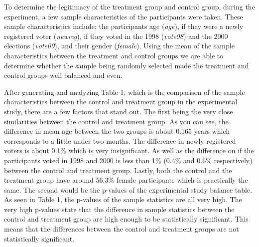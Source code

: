 \documentclass[a4paper]{article}
\begin{document}
\begin{flushleft}
To determine the legitimacy of the treatment group and control group, during the experiment, a few sample characteristics of the participants were taken. These sample characteristics include; the participants age (\textit{age}), if they were a newly registered voter (\textit{newreg}), if they voted in the 1998 (\textit{vote98}) and the 2000 elections (\textit{vote00}), and their gender (\textit{female}). Using the mean of the sample characteristics between the treatment and control groups we are able to determine whether the sample being randomly selected made the treatment and control groups well balanced and even.
\end{flushleft}

\begin{flushleft}
After generating and analyzing Table 1, which is the comparison of the sample characteristics between the control and treatment group in the experimental study, there are a few factors that stand out. The first being the very close similarities between the control and treatment group. As you can see, the difference in mean age between the two groups is about 0.165 years which corresponds to a little under two months. The difference in newly registered voters is about 0.1\% which is very insignificant. As well as the difference on if the participants voted in 1998 and 2000 is less than 1\% (0.4\% and 0.6\% respectively) between the control and treatment group. Lastly, both the control and the treatment group have around 56.3\% female participants which is practically the same. The second would be the p-values of the experimental study balance table. As seen in Table 1, the p-values of the sample statistics are all very high. The very high p-values state that the difference in sample statistics between the control and treatment group are high enough to be statistically significant. This means that the differences between the control and treatment groups are not statistically significant. 
\end{flushleft}
\end{document}
